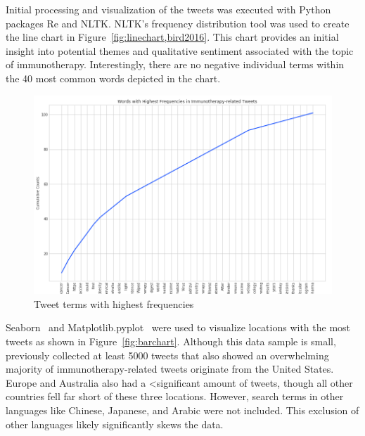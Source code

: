 Initial processing and visualization of the tweets was executed with
Python packages Re and NLTK.  NLTK's frequency distribution tool was
used to create the line chart in
Figure~\ref{fig:linechart,bird2016}.  This chart provides an
initial insight into potential themes and qualitative sentiment
associated with the topic of immunotherapy.  Interestingly, there are
no negative individual terms within the 40 most common words depicted
in the chart.

\begin{figure}[H]
\centering
\includegraphics[width=\columnwidth]{images/linechart.png}
\caption{Tweet terms with highest frequencies}
\label{fig:linechart}
\end{figure} 

Seaborn~\cite{??} and Matplotlib.pyplot~\cite{??} were used to
visualize locations with the most tweets as shown in
Figure~\ref{fig:barchart}. Although this data sample is small,
previously collected at least 5000 tweets that also showed an
overwhelming majority of immunotherapy-related tweets originate from
the United States.  Europe and Australia also had a <significant
amount of tweets, though all other countries fell far short of these
three locations.  However, search terms in other languages like
Chinese, Japanese, and Arabic were not included.  This exclusion of
other languages likely significantly skews the data.

